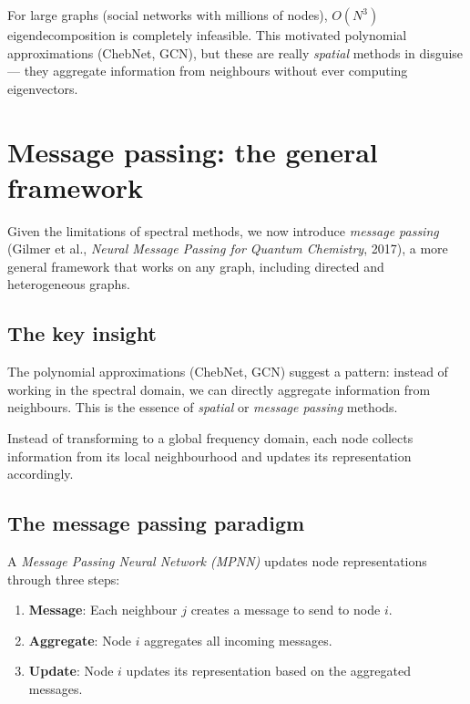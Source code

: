 \begin{notechapter}
For large graphs (social networks with millions of nodes), $O(N^3)$
eigendecomposition is completely infeasible. This motivated polynomial
approximations (ChebNet, GCN), but these are really \emph{spatial}
methods in disguise --- they aggregate information from neighbours without
ever computing eigenvectors.

\section{Message passing: the general framework}

Given the limitations of spectral methods, we now introduce
\emph{message passing} (Gilmer et al., \emph{Neural Message Passing for Quantum Chemistry}, 2017), a more general framework
that works on any graph, including directed and heterogeneous graphs.

\subsection{The key insight}

The polynomial approximations (ChebNet, GCN) suggest a pattern: instead
of working in the spectral domain, we can directly aggregate information
from neighbours. This is the essence of \emph{spatial} or
\emph{message passing} methods.

\begin{keyidea}
Instead of transforming to a global
frequency domain, each node collects information from its local
neighbourhood and updates its representation accordingly.
\end{keyidea}

\subsection{The message passing paradigm}

\begin{definition}
A \emph{Message Passing Neural Network (MPNN)} updates node
representations through three steps:

\begin{enumerate}
    \item \textbf{Message}: Each neighbour $j$ creates a message to send
          to node $i$.
    \item \textbf{Aggregate}: Node $i$ aggregates all incoming messages.
    \item \textbf{Update}: Node $i$ updates its representation based on
          the aggregated messages.
\end{enumerate}


\end{definition}
\end{notechapter}

